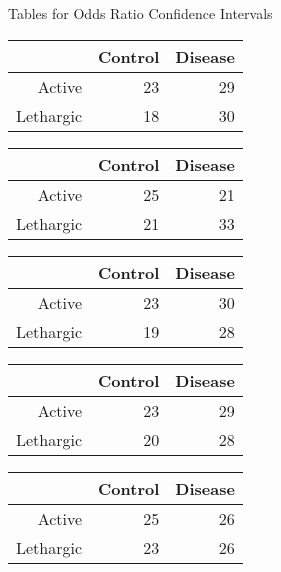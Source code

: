 \documentclass{article}\usepackage{graphicx, color}
\begin{document}
\centerline{Tables for Odds Ratio Confidence Intervals}







\begin{multicols}{3}

\begin{tabular}{rrr}
  \hline
 & Control & Disease \\ 
  \hline
Active &  23 &  29 \\ 
  Lethargic &  18 &  30 \\ 
   \hline
\end{tabular}


\bigskip
\begin{tabular}{rrr}
  \hline
 & Control & Disease \\ 
  \hline
Active &  25 &  21 \\ 
  Lethargic &  21 &  33 \\ 
   \hline
\end{tabular}


\bigskip
\begin{tabular}{rrr}
  \hline
 & Control & Disease \\ 
  \hline
Active &  23 &  30 \\ 
  Lethargic &  19 &  28 \\ 
   \hline
\end{tabular}


\bigskip
\begin{tabular}{rrr}
  \hline
 & Control & Disease \\ 
  \hline
Active &  23 &  29 \\ 
  Lethargic &  20 &  28 \\ 
   \hline
\end{tabular}


\bigskip
\begin{tabular}{rrr}
  \hline
 & Control & Disease \\ 
  \hline
Active &  25 &  26 \\ 
  Lethargic &  23 &  26 \\ 
   \hline
\end{tabular}



\end{multicols}
\end{document}
